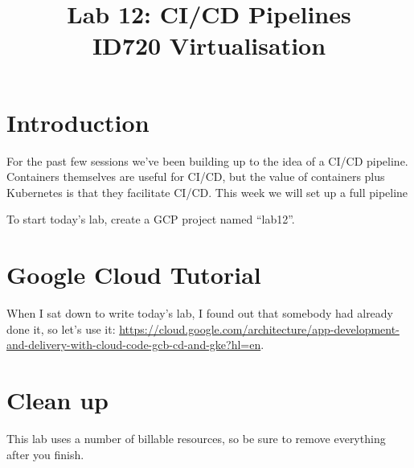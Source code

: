 \documentclass{article}
\begin{document}
\title{Lab 12: CI/CD Pipelines\\ID720 Virtualisation}
\date{}
\maketitle

\section*{Introduction}
For the past few sessions we've been building up to the idea of a CI/CD pipeline. Containers themselves are useful for CI/CD, but the value of containers plus Kubernetes is that they facilitate CI/CD. This week we will set up a full pipeline

To start today's lab, create a GCP project named ``lab12''. 

\section{Google Cloud Tutorial}

When I sat down to write today's lab, I found out that somebody had already done it, so let's use it: \url{https://cloud.google.com/architecture/app-development-and-delivery-with-cloud-code-gcb-cd-and-gke?hl=en}.


\section{Clean up}
This lab uses a number of billable resources, so be sure to remove everything after you finish. 
 
\end{document}
